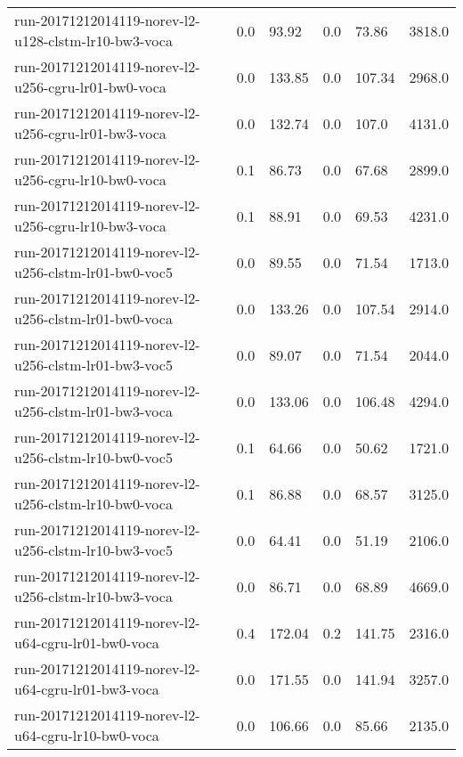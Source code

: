 \begin{landscape}
\begin{longtable}{p{.47\textheight} p{.08\textheight} p{.08\textheight} p{.08\textheight} p{.08\textheight} p{.08\textheight}}
    run-20171212014119-norev-l2-u128-clstm-lr10-bw3-voca & \num{0.0} & \num{93.92} & \num{0.0} & \num{73.86} & \num{3818.0}\\
    run-20171212014119-norev-l2-u256-cgru-lr01-bw0-voca & \num{0.0} & \num{133.85} & \num{0.0} & \num{107.34} & \num{2968.0}\\
    run-20171212014119-norev-l2-u256-cgru-lr01-bw3-voca & \num{0.0} & \num{132.74} & \num{0.0} & \num{107.0} & \num{4131.0}\\
    run-20171212014119-norev-l2-u256-cgru-lr10-bw0-voca & \num{0.1} & \num{86.73} & \num{0.0} & \num{67.68} & \num{2899.0}\\
    run-20171212014119-norev-l2-u256-cgru-lr10-bw3-voca & \num{0.1} & \num{88.91} & \num{0.0} & \num{69.53} & \num{4231.0}\\
    run-20171212014119-norev-l2-u256-clstm-lr01-bw0-voc5 & \num{0.0} & \num{89.55} & \num{0.0} & \num{71.54} & \num{1713.0}\\
    run-20171212014119-norev-l2-u256-clstm-lr01-bw0-voca & \num{0.0} & \num{133.26} & \num{0.0} & \num{107.54} & \num{2914.0}\\
    run-20171212014119-norev-l2-u256-clstm-lr01-bw3-voc5 & \num{0.0} & \num{89.07} & \num{0.0} & \num{71.54} & \num{2044.0}\\
    run-20171212014119-norev-l2-u256-clstm-lr01-bw3-voca & \num{0.0} & \num{133.06} & \num{0.0} & \num{106.48} & \num{4294.0}\\
    run-20171212014119-norev-l2-u256-clstm-lr10-bw0-voc5 & \num{0.1} & \num{64.66} & \num{0.0} & \num{50.62} & \num{1721.0}\\
    run-20171212014119-norev-l2-u256-clstm-lr10-bw0-voca & \num{0.1} & \num{86.88} & \num{0.0} & \num{68.57} & \num{3125.0}\\
    run-20171212014119-norev-l2-u256-clstm-lr10-bw3-voc5 & \num{0.0} & \num{64.41} & \num{0.0} & \num{51.19} & \num{2106.0}\\
    run-20171212014119-norev-l2-u256-clstm-lr10-bw3-voca & \num{0.0} & \num{86.71} & \num{0.0} & \num{68.89} & \num{4669.0}\\
    run-20171212014119-norev-l2-u64-cgru-lr01-bw0-voca & \num{0.4} & \num{172.04} & \num{0.2} & \num{141.75} & \num{2316.0}\\
    run-20171212014119-norev-l2-u64-cgru-lr01-bw3-voca & \num{0.0} & \num{171.55} & \num{0.0} & \num{141.94} & \num{3257.0}\\
    run-20171212014119-norev-l2-u64-cgru-lr10-bw0-voca & \num{0.0} & \num{106.66} & \num{0.0} & \num{85.66} & \num{2135.0}\\

\end{longtable}
\end{landscape}
